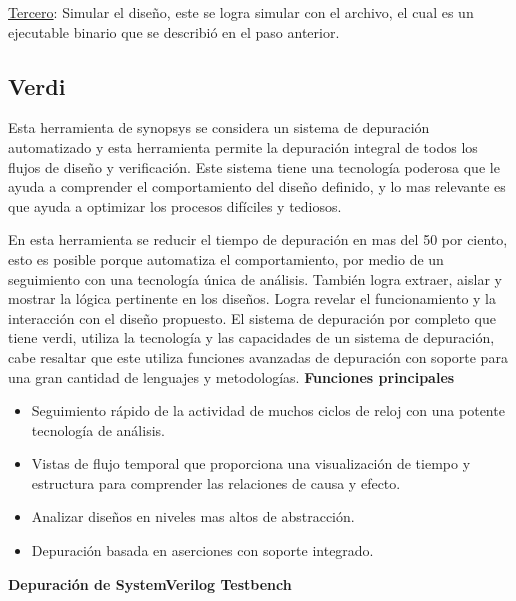   \underline{Tercero}: Simular el diseño, este se logra simular con el archivo, el cual es un ejecutable binario que se describió en el paso anterior. 
 \cite{Jeff} 
  
  \subsection*{Verdi}
  Esta herramienta de synopsys se considera un sistema de depuración automatizado y esta herramienta permite la depuración integral de todos los flujos de diseño y verificación.  Este sistema tiene una tecnología poderosa que le ayuda a comprender el comportamiento del diseño definido, y lo mas relevante es que ayuda a optimizar los procesos difíciles y tediosos.
  
  En esta herramienta se reducir el tiempo de depuración en mas del 50 por ciento, esto es posible porque automatiza el comportamiento, por medio de un seguimiento con una tecnología única de análisis. También logra extraer, aislar y mostrar la lógica pertinente en los diseños. Logra revelar el funcionamiento y la interacción con el diseño propuesto.
  El sistema de depuración por completo que tiene verdi, utiliza la tecnología y las capacidades de un sistema de depuración, cabe resaltar que este utiliza funciones avanzadas de depuración con soporte para una gran cantidad de lenguajes y metodologías.
  \cite{verdi} 
  \textbf{Funciones principales}  
  
  \begin{itemize}
    \item Seguimiento rápido de la actividad de muchos ciclos de reloj con una potente tecnología de análisis.
    \item Vistas de flujo temporal que proporciona una visualización de tiempo y estructura para comprender las relaciones de causa y efecto.
    \item Analizar diseños en niveles mas altos de abstracción.
    \item Depuración basada en aserciones con soporte integrado.
\end{itemize}

\textbf{Depuración de SystemVerilog Testbench}

